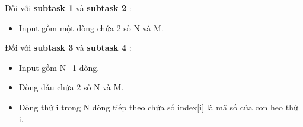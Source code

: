 Đối với \textbf{ subtask 1 } và \textbf{ subtask 2 } :
\begin{itemize}
	\item Input gồm một dòng chứa 2 số N và M.
\end{itemize}

Đối với \textbf{ subtask 3 } và \textbf{ subtask 4 } :
\begin{itemize}
	\item Input gồm N+1 dòng.
	\item Dòng đầu chứa 2 số N và M.
	\item Dòng thứ i trong N dòng tiếp theo chứa số index[i] là mã số của con heo thứ i.
\end{itemize}
\begin{itemize}
\end{itemize}